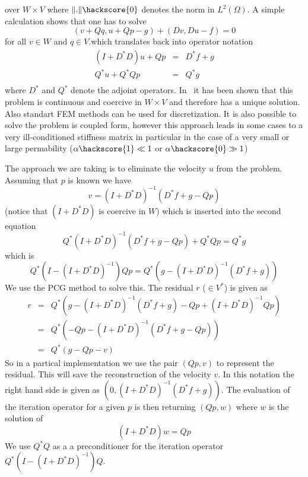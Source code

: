 over $W \times V$ where $\|.\|\hackscore{0}$ denotes the norm in $L^2(\Omega)$. A simple calculation shows that
one has to solve
\begin{equation}
( v + Qq , u + Qp - g) + (Dv,Du-f) =0 
\end{equation} 
for all $v\in W$ and $q \in V$.which translates back into operator notation
\begin{equation}
\begin{array}{rcl}
(I+D^*D)u + Qp & = & D^*f + g \\
Q^*u  + Q^*Q p & = & Q^*g \\ 
\end{array}
\end{equation} 
where $D^*$ and $Q^*$ denote the adjoint operators. 
In~\cite{XXX} it has been shown that this problem is continuous and coercive in $W \times V$ and therefore has a unique solution. Also standart FEM methods can be used for discretization. It is also possible 
to solve the problem is coupled form, however this approach leads in some cases to a very ill-conditioned stiffness matrix in particular in the case of a very small or large permability ($\alpha\hackscore{1} \ll 1$ or $\alpha\hackscore{0} \gg 1$)  

The approach we are taking is to eliminate the velocity $u$ from the problem. Assuming that $p$ is known we have
\begin{equation}
v= (I+D^*D)^{-1} (D^*f + g - Qp)
\end{equation} 
(notice that $(I+D^*D)$ is coercive in $W$) which is inserted into the second equation
\begin{equation}
Q^* (I+D^*D)^{-1} (D^*f + g - Qp) + Q^* Q p = Q^*g 
\end{equation} 
which is 
\begin{equation}
Q^* ( I - (I+D^*D)^{-1} ) Q p = Q^* (g-(I+D^*D)^{-1} (D^*f + g) ) 
\end{equation} 
We use the PCG  method to solve this. The residual $r$ ($\in V^*$) is given as
\begin{equation}
\begin{array}{rcl}
r & = & Q^*  \left( g -(I+D^*D)^{-1} (D^*f + g) - Qp + (I+D^*D)^{-1}Q p \right)\\
& =&  Q^* \left( - Qp - (I+D^*D)^{-1} (D^*f + g - Qp) \right) \\
& =&  Q^* \left( g - Qp - v \right)
\end{array}
\end{equation} 
So in a partical implementation we use the pair $(Qp,v)$ to represent the residual. This will save the
reconstruction of the velocity $v$. In this notation the right hand side is given as 
$(0,(I+D^*D)^{-1} (D^*f + g))$. The evaluation of the iteration operator for a given $p$ is then 
returning $(Qp,w)$ where $w$ is the solution of 
\begin{equation}\label{UPDATE W}
(I+D^*D)w = Qp
\end{equation}
We use $Q^*Q$ as a a preconditioner for the iteration operator $Q^* ( I - (I+D^*D)^{-1} ) Q$.

